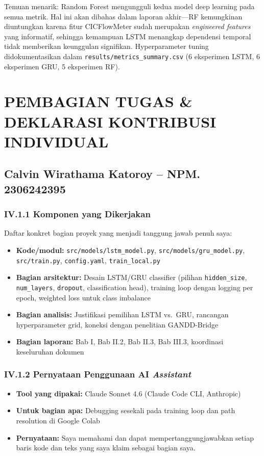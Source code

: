 \documentclass[11pt,a4paper,oneside]{report}
\begin{document}
Temuan menarik: Random Forest mengungguli kedua model deep learning pada semua metrik. Hal ini akan dibahas dalam laporan akhir---RF kemungkinan diuntungkan karena fitur CICFlowMeter sudah merupakan \textit{engineered features} yang informatif, sehingga kemampuan LSTM menangkap dependensi temporal tidak memberikan keunggulan signifikan. Hyperparameter tuning didokumentasikan dalam \texttt{results/metrics\_summary.csv} (6 eksperimen LSTM, 6 eksperimen GRU, 5 eksperimen RF).

\chapter{PEMBAGIAN TUGAS \& DEKLARASI KONTRIBUSI INDIVIDUAL}
\label{bab:kontribusi}

\section{Calvin Wirathama Katoroy -- NPM. 2306242395}

\subsection*{IV.1.1 Komponen yang Dikerjakan}
Daftar konkret bagian proyek yang menjadi tanggung jawab penuh saya:
\begin{itemize}[leftmargin=*]
    \item \textbf{Kode/modul:} \texttt{src/models/lstm\_model.py}, \texttt{src/models/gru\_model.py}, \texttt{src/train.py}, \texttt{config.yaml}, \texttt{train\_local.py}
    \item \textbf{Bagian arsitektur:} Desain LSTM/GRU classifier (pilihan \texttt{hidden\_size}, \texttt{num\_layers}, \texttt{dropout}, classification head), training loop dengan logging per epoch, weighted loss untuk class imbalance
    \item \textbf{Bagian analisis:} Justifikasi pemilihan LSTM vs.\ GRU, rancangan hyperparameter grid, koneksi dengan penelitian GANDD-Bridge
    \item \textbf{Bagian laporan:} Bab I, Bab II.2, Bab II.3, Bab III.3, koordinasi keseluruhan dokumen
\end{itemize}

\subsection*{IV.1.2 Pernyataan Penggunaan AI \textit{Assistant}}
\begin{itemize}[leftmargin=*]
    \item \textbf{Tool yang dipakai:} Claude Sonnet 4.6 (Claude Code CLI, Anthropic)
    \item \textbf{Untuk bagian apa:} Debugging sesekali pada training loop dan path resolution di Google Colab
    \item \textbf{Pernyataan:} Saya memahami dan dapat mempertanggungjawabkan setiap baris kode dan teks yang saya klaim sebagai bagian saya.
\end{itemize}
\end{document}
